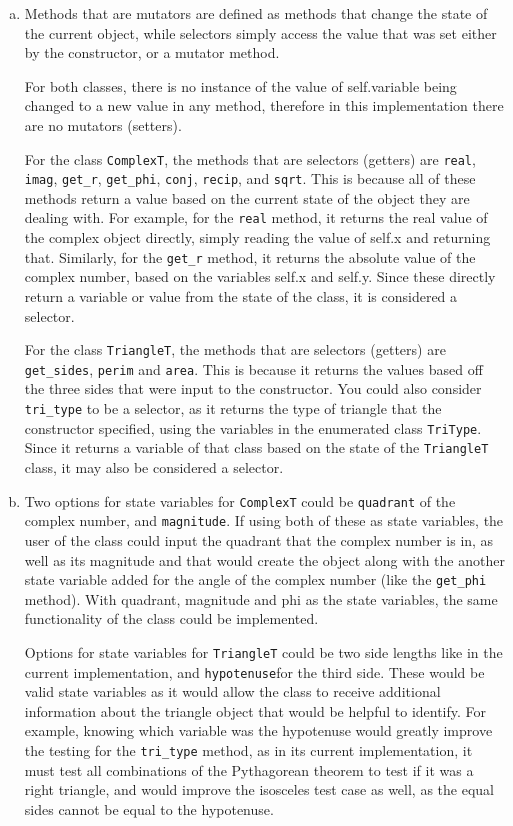 \documentclass[12pt]{article}
\begin{document}
\begin{enumerate}[(a)]

\item Methods that are mutators are defined as methods that change the state 
of the current object, while selectors simply access the value that was set 
either by the constructor, or a mutator method. 

For both classes, there is no instance of the value of self.variable being 
changed to a new value in any method, therefore in this implementation there 
are no mutators (setters).

For the class \verb|ComplexT|, the methods that are selectors (getters) are 
\verb|real|, \verb|imag|, \verb|get_r|, \verb|get_phi|, \verb|conj|, \verb|recip|, 
and \verb|sqrt|. This is because all of these methods return a value based on the 
current state of the object they are dealing with. For example, for the 
\verb|real| method, it returns the real value of the complex object directly, 
simply reading the value of self.x and returning that. Similarly, for the 
\verb|get_r| method, it returns the absolute value of the complex number, based 
on the variables self.x and self.y. Since these directly return a variable or 
value from the state of the class, it is considered a selector. 

For the class \verb|TriangleT|, the methods that are selectors (getters) are 
\verb|get_sides|, \verb|perim| and \verb|area|. This is because it returns the 
values based off the three sides that were input to the constructor. You could 
also consider \verb|tri_type| to be a selector, as it returns the type of 
triangle that the constructor specified, using the variables in the enumerated 
class \verb|TriType|. Since it returns a variable of that class based on the 
state of the \verb|TriangleT| class, it may also be considered a selector. 

\item Two options for state variables for \verb|ComplexT| could be \verb|quadrant| 
of the complex number, and \verb|magnitude|. If using both of these as state 
variables, the user of the class could input the quadrant that the complex number 
is in, as well as its magnitude and that would create the object along with the 
another state variable added for the angle of the complex number (like the 
\verb|get_phi| method). With quadrant, magnitude and phi as the state 
variables, the same functionality of the class could be implemented. 

Options for state variables for \verb|TriangleT| could be two side lengths 
like in the current implementation, and \verb|hypotenuse|for the third side. 
These would be valid state variables as it would allow the class to receive
additional information about the triangle object that would be helpful to 
identify. For example, knowing which variable was the hypotenuse would 
greatly improve the testing for the \verb|tri_type| method, as in its 
current implementation, it must test all combinations of the Pythagorean 
theorem to test if it was a right triangle, and would improve the 
isosceles test case as well, as the equal sides cannot be equal to 
the hypotenuse.


\end{enumerate}
\end{document}
